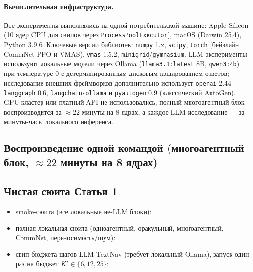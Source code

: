 \documentclass{article}
\begin{document}
\paragraph{Вычислительная инфраструктура.} Все эксперименты выполнялись на одной
потребительской машине: Apple Silicon (10 ядер CPU для свипов через
\texttt{ProcessPoolExecutor}), macOS (Darwin 25.4), Python 3.9.6.
Ключевые версии библиотек: \texttt{numpy} 1.x, \texttt{scipy},
\texttt{torch} (бейзлайн CommNet-PPO и VMAS), \texttt{vmas} 1.5.2,
\texttt{minigrid}/\texttt{gymnasium}. LLM-эксперименты используют локальные
модели через Ollama (\texttt{llama3.1:latest} 8B, \texttt{qwen3:4b}) при
температуре $0$ с детерминированным дисковым кэшированием ответов;
исследование внешних фреймворков дополнительно использует \texttt{openai} 2.44,
\texttt{langgraph} 0.6, \texttt{langchain-ollama} и
\texttt{pyautogen} 0.9 (классический AutoGen). GPU-кластер или платный API
не использовались; полный многоагентный блок воспроизводится за ${\approx}22$
минуты на 8 ядрах, а каждое LLM-исследование --- за минуты-часы локального
инференса.

\subsection*{Воспроизведение одной командой (многоагентный блок, $\approx 22$ минуты на 8 ядрах)}

\subsection*{Чистая сюита Статьи 1}
\begin{itemize}[leftmargin=16pt]
\item smoke-сюита (все локальные не-LLM блоки): 
\item полная локальная сюита (одноагентный, оракульный, многоагентный, CommNet, переносимость/шум): 
\item свип бюджета шагов LLM TextNav (требует локальный Ollama), запуск один раз на бюджет $K'\in\{6,12,25\}$: 
\end{itemize}
\end{document}
